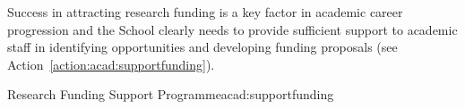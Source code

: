 Success in attracting research funding is a key factor in academic career progression and the School clearly needs to provide sufficient support to academic staff in identifying opportunities and developing funding proposals (see Action~\ref{action:acad:supportfunding}). 


\begin{actionblock}{\ksspace{}Research Funding Support Programme}{acad:supportfunding}
\actsupportprogramme
\hfill{
    \hypersetup{hidelinks}
    \hyperlink{c16}{\gotoactionsymbol{}}
}
\end{actionblock}

%
%

